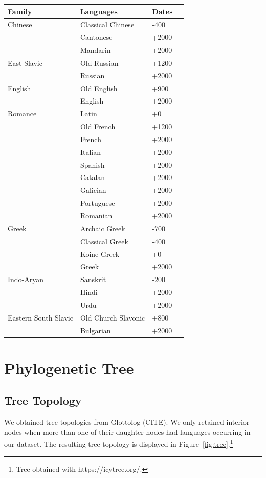 \documentclass[11pt,a4paper]{article}
\begin{document}
\begin{tabular}{llll} \hline
Family & Languages & Dates \\ \hline\hline
Chinese & Classical Chinese & -400  \\
& Cantonese & +2000\\ 
& Mandarin & +2000 \\ \hline
East Slavic & Old Russian & +1200 \\
& Russian & +2000 \\ \hline
English & Old English & +900 \\
& English  & +2000\\ \hline
Romance & Latin &+0  \\
& Old French &+1200\\
& French  & +2000\\
& Italian & +2000\\
& Spanish & +2000\\
& Catalan & +2000\\
& Galician & +2000\\
& Portuguese & +2000\\
& Romanian & +2000\\ \hline
Greek & Archaic Greek & -700 \\
      & Classical Greek & -400 \\
      & Koine Greek & +0\\
& Greek  & +2000\\ \hline
Indo-Aryan & Sanskrit & -200 \\
& Hindi  & +2000\\
& Urdu  & +2000\\ \hline
Eastern South Slavic & Old Church Slavonic & +800 \\
& Bulgarian  & +2000\\ \hline
\end{tabular}

\section{Phylogenetic Tree}

\subsection{Tree Topology}

We obtained tree topologies from Glottolog (CITE).
We only retained interior nodes when more than one of their daughter nodes had languages occurring in our dataset.
The resulting tree topology is displayed in Figure~\ref{fig:tree}.\footnote{Tree obtained with https://icytree.org/.}
\end{document}
